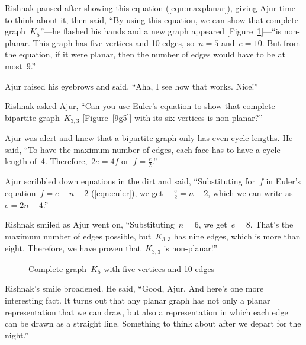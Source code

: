 Rishnak paused after showing this equation (\ref{eqn:maxplanar}), giving Ajur time to think about it, then said, ``By using this equation, we can show that complete graph~$K_5$''---he flashed his hands and a new graph appeared [Figure~\ref{9g10}]---``is non-planar. This graph has five vertices and 10 edges, so~$n=5$ and~$e=10$. But from the equation, if it were planar, then the number of edges would have to be at most~$9$.''

Ajur raised his eyebrows and said, ``Aha, I see how that works. Nice!''

Rishnak asked Ajur, ``Can you use Euler's equation to show that complete bipartite graph~$K_{3,3}$ [Figure~\ref{9g5}] with its six vertices is non-planar?''

Ajur was alert and knew that a bipartite graph only has even cycle lengths. He said, ``To have the maximum number of edges, each face has to have a cycle length of~4. Therefore,~$2e=4f$ or~$f=\frac{e}{2}$.''

Ajur scribbled down equations in the dirt and said, ``Substituting for~$f$ in Euler's equation~$f=e-n+2$ (\ref{eqn:euler}), we get~$-\frac{e}{2}=n-2$, which we can write as~$e=2n-4$.''

Rishnak smiled as Ajur went on, ``Substituting~$n=6$, we get~$e=8$. That's the maximum number of edges possible, but~$K_{3,3}$ has nine edges, which is more than eight. Therefore, we have proven that~$K_{3,3}$ is non-planar!''

\begin{figure}
\begin{center}
\caption{Complete graph~$K_5$ with five vertices and 10 edges}\label{9g10}
\end{center}
\end{figure}

Rishnak's smile broadened. He said, ``Good, Ajur. And here's one more interesting fact. It turns out that any planar graph has not only a planar representation that we can draw, but also a representation in which each edge can be drawn as a straight line. Something to think about after we depart for the night.''

